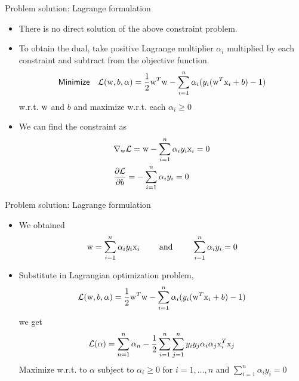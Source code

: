 \begin{frame}{Problem solution: Lagrange formulation}
\begin{itemize}
\item There is no direct solution of the above constraint problem.
\item To obtain the dual, take positive Lagrange multiplier $\alpha_i$ multiplied by each constraint and subtract from the objective function.
\[{\sf Minimize}~~~\mathcal{L}({\rm w},b,\alpha)=\frac{1}{2}{\rm w}^T{\rm w} -\sum_{i=1}^{n} \alpha_i (y_i({\rm w}^T{\rm x}_i+b)-1)\]
w.r.t. ${\rm w}$ and $b$ and maximize w.r.t. each $\alpha_{i}\geq 0$
\item We can find the constraint as
\[\begin{gathered}
  {\nabla _{\rm w}}\mathcal{L} = {\rm w} - \sum\limits_{i = 1}^n {{\alpha _i}{y_i}{{\rm x}_i} = 0}  \hfill \\
  \frac{{\partial \mathcal{L}}}{{\partial b}} =  - \sum\limits_{i = 1}^n {{\alpha _i}{y_i} = 0}  \hfill \\ 
\end{gathered} \]
\end{itemize}
\end{frame}




\begin{frame}{Problem solution: Lagrange formulation}
\begin{itemize}
\item We obtained
\[ {\rm w} = \sum\limits_{i = 1}^n {{\alpha _i}{y_i}{{\rm x}_i}}    ~~~~~~~ \text{and} ~~~~~~~    \sum\limits_{i = 1}^n {{\alpha _i}{y_i} = 0} \]
\item Substitute in Lagrangian optimization problem,
\[\mathcal{L}({\rm w},b,\alpha ) = \frac{1}{2}{{\rm w}^T}{\rm w} - \sum\limits_{i = 1}^n {{\alpha _i}({y_i}({{\rm w}^T}{{\rm x}_i} + b) - 1)} \]
 we get
 \[\mathcal{L}(\alpha ) = \sum_{n=1}^{n}\alpha_n -\frac{1}{2}\sum_{i=1}^{n} \sum\limits_{j= 1}^n y_iy_j\alpha_i\alpha_j {\rm x}_i^T{\rm x}_j\]
 Maximize w.r.t. to $\alpha$ subject to $\alpha_i\geq 0$ for $i=1,\ldots,n$ and $\sum_{i=1}^n\alpha_iy_i =0$
\end{itemize}
\end{frame}

